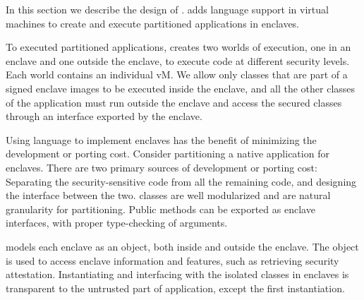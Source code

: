 \label{sec:implementation}

In this section we describe the design of \sysname{}.
\sysname{} adds language support in \java{} virtual machines to
create and execute partitioned applications in enclaves.


To executed partitioned applications,
\sysname{} creates two worlds of \java{} execution,
one in an enclave and one outside the enclave,
to execute code at different security levels.
Each world contains an individual \java{} vM.
We allow only classes that are part of a signed enclave images to
be executed inside the enclave,
and all the other classes of the application
must run outside the enclave and access the secured classes through
an interface exported by the enclave.

Using \java{} language to implement enclaves
has the benefit of minimizing the development or porting cost.
Consider partitioning a native application for enclaves.
There are two primary sources of development or porting cost:
Separating the security-sensitive code from all the remaining code,
and designing the interface between the two.
\java{} classes are well modularized and are natural granularity for partitioning.
Public methods can be exported as
enclave interfaces, with proper type-checking of arguments.

\sysname{} models each enclave as an object,
both inside and outside the enclave.
The object is used to access enclave information and features,
such as retrieving security attestation.
Instantiating and interfacing with the isolated classes
in enclaves is transparent to the untrusted part of application,
except the first instantiation.


